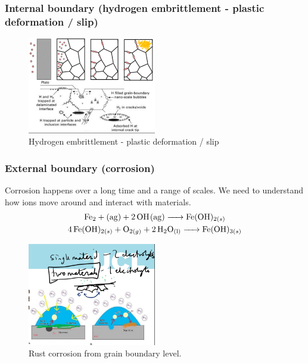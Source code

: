 \documentclass[class=report, crop=false, 12pt,a4paper]{standalone}
\begin{document}
\subsubsection{Internal boundary (hydrogen embrittlement - plastic deformation / slip)}
\begin{figure}[H]
	\centering
	\includegraphics[width = 0.5\textwidth]{../img/figure5.png}
	\caption{Hydrogen embrittlement - plastic deformation / slip}
\end{figure}
\subsubsection{External boundary (corrosion)}
Corrosion happens over a long time and a range of scales. We need to understand how ions move around and interact with materials.
\begin{gather}
	\ce{Fe2 + (ag) + 2OH(ag) -> Fe(OH)_{2(s)}}\\
	\ce{4Fe(OH)_{2(s)} + O_{2(g)} + 2H2O_{(l)} -> Fe(OH)_{3(s)}}
\end{gather}
\begin{figure}[H]
	\centering
	\includegraphics[width = 0.5\textwidth]{../img/figure6.png}
	\caption{Rust corrosion from grain boundary level.}
\end{figure}
\end{document}
